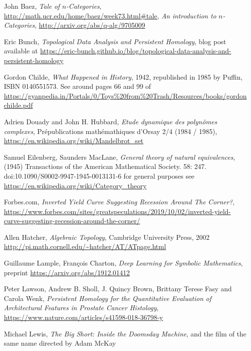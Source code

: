 \documentclass{article}
\begin{document}
\small
\begin{thebibliography}{99}

 John Baez, \textit{Tale of $n$-Categories}, \url{http://math.ucr.edu/home/baez/week73.html#tale}, \textit{An introduction to $n$-Categories}, \url{http://arxiv.org/abs/q-alg/9705009}

 Eric Bunch, \textit{Topological Data Analysis and Persistent Homology}, blog post available at \url{https://eric-bunch.github.io/blog/topological-data-analysis-and-persistent-homology}

 Gordon Childe, \textit{What Happened in History}, 1942, republished in 1985 by Puffin, ISBN 0140551573. See around pages 66 and 99 of \url{https://gyanpedia.in/Portals/0/Toys%20from%20Trash/Resources/books/gordonchilde.pdf}

 Adrien Douady and John H. Hubbard, \textit{Etude dynamique des polyn\^omes complexes}, Pr\'epublications math\'emathiques d'Orsay 2/4 (1984 / 1985), \url{https://en.wikipedia.org/wiki/Mandelbrot_set}

 Samuel Eilenberg, Saunders MacLane, \textit{General theory of natural equivalences}, (1945) Transactions of the American Mathematical Society. 58: 247. doi:10.1090/S0002-9947-1945-0013131-6 for general purposes see \url{https://en.wikipedia.org/wiki/Category_theory}

 Forbes.com, \textit{Inverted Yield Curve Suggesting Recession Around The Corner?}, \url{https://www.forbes.com/sites/greatspeculations/2019/10/02/inverted-yield-curve-suggesting-recession-around-the-corner/}

 Allen Hatcher, \textit{Algebraic Topology}, Cambridge University Press, 2002 \url{http://pi.math.cornell.edu/~hatcher/AT/ATpage.html}

 Guillaume Lample, Fran\c cois Charton, \textit{Deep Learning for Symbolic Mathematics}, preprint \url{https://arxiv.org/abs/1912.01412}

 Peter Lawson, Andrew B. Sholl, J. Quincy Brown, Brittany Terese Fasy and Carola Wenk, \textit{Persistent Homology for the Quantitative Evaluation of Architectural Features in Prostate Cancer Histology}, \url{https://www.nature.com/articles/s41598-018-36798-y}

 Michael Lewis, \textit{The Big Short: Inside the Doomsday Machine}, and the film of the same name directed by Adam McKay


\end{thebibliography}
\end{document}
